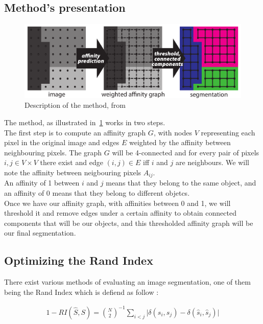 \subsection{Method's presentation}

\begin{figure}[!htbp]
	\centering
	\includegraphics[width=0.8\linewidth]{./images/malis_method.png}
	\caption{Description of the method, from~\cite{turaga_maximin_2009}}%
	\label{fig:malis_method}
\end{figure}

The method, as illustrated in~\ref{fig:malis_method} works in two steps.\\
The first step is to compute an affinity graph $G$, with nodes $V$ representing
each pixel in the original image and edges $E$ weighted by the affinity between
neighbouring pixels. The graph $G$ will be 4-connected and for every pair of
pixels $i, j \in V\times V$ there exist and edge $(i,j)\in E$ iff $i$ and $j$ are
neighbours. We will note the affinity between neigbouring pixels $A_{ij}$.\\
An affinity of 1 between $i$ and $j$ means that they belong to the same object,
and an affinity of 0 means that they belong to different objetcs.\\

Once we have our affinity graph, with affinities between 0 and 1, we will
threshold it and remove edges under a certain affinity to obtain connected
components that will be our objects, and this thresholded affinity graph will
be our final segmentation.\\


\subsection{Optimizing the Rand Index}

There exist various methods of evaluating an image segmentation, one of them
being the Rand Index which is defiend as follow :

\begin{gather*}
	1 - RI(\hat{S},S) = \binom{N}{2}^{-1} \sum_{i<j} \lvert \delta(s_i,s_j) -
	\delta(\hat{s}_i,\hat{s}_j) \rvert
\end{gather*}

